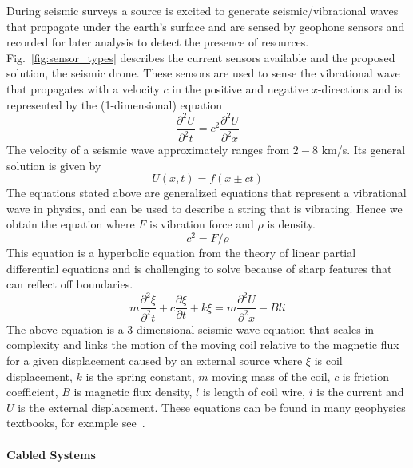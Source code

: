 During seismic surveys a source is excited to generate seismic/vibrational waves that propagate under the earth's surface and are sensed by geophone sensors and recorded for later analysis to detect the presence of resources. Fig.~\ref{fig:sensor_types} describes the current sensors available and the proposed solution, the seismic drone. These sensors are used to sense the vibrational wave that propagates with a velocity $c$ in the positive and negative $x$-directions and is represented by the (1-dimensional) equation
\begin{equation}
\frac{\partial^{2}{U}}{\partial^{2}{t}} = {c}^{2}\frac{\partial^{2}{U}}{\partial^{2}{x}}
\end{equation}
The velocity of a seismic wave approximately ranges from $2-8$ km/s.
Its general solution is given by
\begin{equation}
U(x,t) = f(x \pm ct)
\end{equation}
The equations stated above are generalized equations that represent a vibrational wave in physics, and can be used to describe a string that is vibrating. Hence we obtain the equation where $F$ is vibration force and $\rho$ is density.
\begin{equation}
{c}^{2} = F/\rho
\end{equation}
This equation is a hyperbolic equation from the theory of linear partial differential equations and is challenging to solve because of sharp features that can reflect off boundaries.
\begin{equation}
m\frac{\partial^{2}{\xi}}{\partial^{2}{t}}+c\frac{\partial{\xi}}{\partial{t}}+k\xi = m\frac{\partial^{2}{U}}{\partial^{2}{x}}-Bli
\end{equation} 
The above equation is a $3$-dimensional seismic wave equation that scales in complexity and links the motion of the moving coil relative to the magnetic flux for a given displacement caused by an external source where $\xi$ is coil displacement, $k$ is the spring constant, $m$ moving mass of the coil, $c$ is friction coefficient, $B$ is magnetic flux density, $l$ is length of coil wire, $i$ is the current and $U$ is the external displacement. These equations can be found in many geophysics textbooks, for example see~\cite{shearer2009introduction}.

 \paragraph{Cabled Systems}

